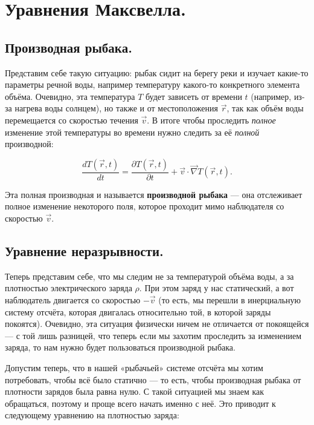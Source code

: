 \documentclass[a4paper,12pt]{article}
\numberwithin{equation}{section}
\newcommand{\pt}{\partial}
\newcommand{\vn}{\vec{\nabla}}
\begin{document}
\section{Уравнения Максвелла.}
\label{sec:maxwell}

\subsection{Производная рыбака.}
\label{sec:material_derivative}

Представим себе такую ситуацию: рыбак сидит на берегу реки и изучает
какие-то параметры речной воды, например температуру какого-то
конкретного элемента объёма. Очевидно, эта температура $T$ будет
зависеть от времени $t$ (например, из-за нагрева воды солнцем), но
также и от местоположения $\vec{r}$, так как объём воды перемещается
со скоростью течения $\vec{v}$. В итоге чтобы проследить
\textit{полное} изменение этой температуры во времени нужно следить за
её \textit{полной} производной: 

\begin{equation}
  \label{eq:def_material_derivative}
  \frac{d T(\vec{r},t)}{dt} = \frac{\pt T (\vec{r},t)}{\pt t} +
  \vec{v} \cdot \vn T (\vec{r},t).
\end{equation}

Эта полная производная и называется \textbf{производной рыбака} — она
отслеживает полное изменение некоторого поля, которое проходит мимо
наблюдателя со скоростью $\vec{v}$. 

\subsection{Уравнение неразрывности.}
\label{sec:cont_eq}

Теперь представим себе, что мы следим не за температурой объёма воды,
а за плотностью электрического заряда $\rho$. При этом заряд у нас
статический, а вот наблюдатель двигается со скоростью $-\vec{v}$ (то
есть, мы перешли в инерциальную систему отсчёта, которая двигалась
относительно той, в которой заряды покоятся). Очевидно, эта ситуация
физически ничем не отличается от покоящейся — с той лишь разницей, что
теперь если мы захотим проследить за изменением заряда, то нам нужно
будет пользоваться производной рыбака. 

Допустим теперь, что в нашей «рыбачьей» системе отсчёта мы хотим
потребовать, чтобы всё было статично — то есть, чтобы производная
рыбака от плотности зарядов была равна нулю. С такой ситуацией мы
знаем как обращаться, поэтому и проще всего начать именно с неё. Это
приводит к следующему уравнению на плотностью заряда: 
\end{document}
